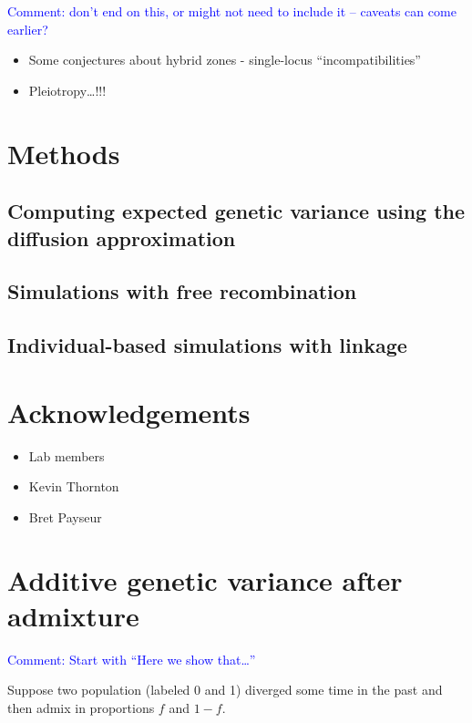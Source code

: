 \documentclass{article}
\newcommand{\aprcomment}[1]{{\textcolor{blue}{Comment: #1}}}
\begin{document}
\aprcomment{don't end on this, or might not need to include it -- caveats can
come earlier?}
\begin{itemize}
    \item Some conjectures about hybrid zones - single-locus ``incompatibilities''
    \item Pleiotropy\dots!!!
\end{itemize}

\section*{Methods}

\subsection*{Computing expected genetic variance using the diffusion approximation}

\subsection*{Simulations with free recombination}

\subsection*{Individual-based simulations with linkage}

\section*{Acknowledgements}
\begin{itemize}
    \item Lab members
    \item Kevin Thornton
    \item Bret Payseur
\end{itemize}




\appendix

\section{Additive genetic variance after admixture}\label{sec:VG-admixture}

\aprcomment{Start with ``Here we show that\dots''}

Suppose two population (labeled 0 and 1) diverged some time in the past and
then admix in proportions $f$ and $1-f$.
\end{document}
